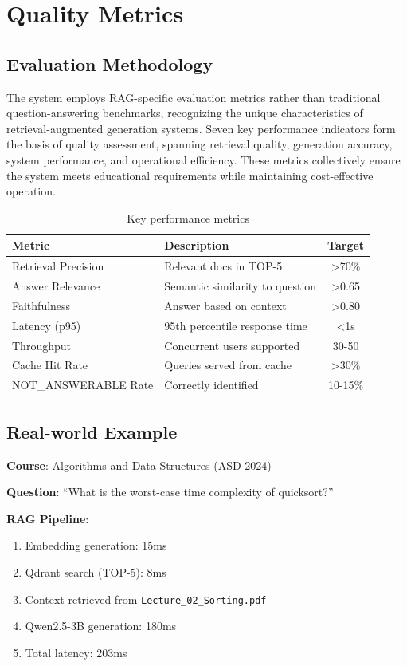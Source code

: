 \documentclass[12pt,a4paper]{article}
\begin{document}
\section{Quality Metrics}

\subsection{Evaluation Methodology}

The system employs RAG-specific evaluation metrics rather than traditional question-answering benchmarks, recognizing the unique characteristics of retrieval-augmented generation systems. Seven key performance indicators form the basis of quality assessment, spanning retrieval quality, generation accuracy, system performance, and operational efficiency. These metrics collectively ensure the system meets educational requirements while maintaining cost-effective operation.

\begin{table}[H]
\centering
\caption{Key performance metrics}
\begin{tabular}{@{}llc@{}}
\toprule
\textbf{Metric} & \textbf{Description} & \textbf{Target} \\ \midrule
Retrieval Precision & Relevant docs in TOP-5 & >70\% \\
Answer Relevance & Semantic similarity to question & >0.65 \\
Faithfulness & Answer based on context & >0.80 \\
Latency (p95) & 95th percentile response time & <1s \\
Throughput & Concurrent users supported & 30-50 \\
Cache Hit Rate & Queries served from cache & >30\% \\
NOT\_ANSWERABLE Rate & Correctly identified & 10-15\% \\ \bottomrule
\end{tabular}
\end{table}

\subsection{Real-world Example}

\textbf{Course}: Algorithms and Data Structures (ASD-2024)

\textbf{Question}: ``What is the worst-case time complexity of quicksort?''

\textbf{RAG Pipeline}:
\begin{enumerate}
    \item Embedding generation: 15ms
    \item Qdrant search (TOP-5): 8ms
    \item Context retrieved from \texttt{Lecture\_02\_Sorting.pdf}
    \item Qwen2.5-3B generation: 180ms
    \item Total latency: 203ms
\end{enumerate}
\end{document}
